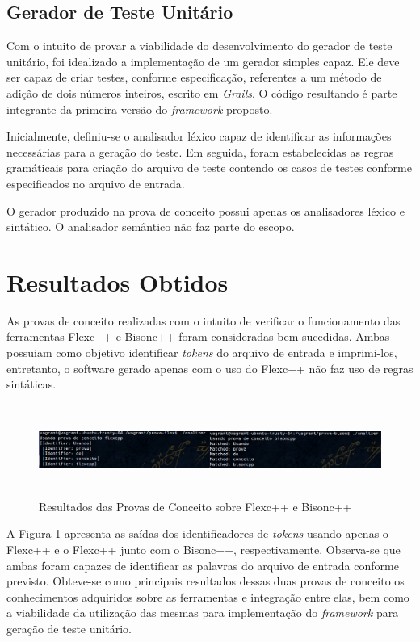 \subsection{Gerador de Teste Unitário}
Com o intuito de provar a viabilidade do desenvolvimento do gerador de teste unitário, foi idealizado a implementação de um gerador simples capaz. Ele deve ser capaz de criar testes, conforme especificação, referentes a um método de adição de dois números inteiros, escrito em \textit{Grails}. O código resultando é parte integrante da primeira versão do \textit{framework} proposto. 
\par 
\indent Inicialmente, definiu-se o analisador léxico capaz de identificar as informações necessárias para a geração do teste. Em seguida, foram estabelecidas as regras gramáticais para criação do arquivo de teste contendo os casos de testes conforme especificados no arquivo de entrada.
\par 
\indent O gerador produzido na prova de conceito possui apenas os analisadores léxico e sintático. O analisador semântico não faz parte do escopo.

\section{Resultados Obtidos}
As provas de conceito realizadas com o intuito de verificar o funcionamento das ferramentas Flexc++ e Bisonc++ foram consideradas bem sucedidas. Ambas possuiam como objetivo identificar \textit{tokens} do arquivo de entrada e imprimi-los, entretanto, o software gerado apenas com o uso do Flexc++ não faz uso de regras sintáticas. 

 \begin{figure}[h]
    \centering
    \includegraphics[width=\textwidth,height=3cm]{figuras/resultadosPCBF.png}
    \caption{Resultados das Provas de Conceito sobre Flexc++ e Bisonc++}
    \label{fig:resultadosPCBF}
 \end{figure}

\par
\indent A Figura \ref{fig:resultadosPCBF} apresenta as saídas dos identificadores de \textit{tokens} usando apenas o Flexc++ e o Flexc++ junto com o Bisonc++, respectivamente. Observa-se que ambas foram capazes de identificar as palavras do arquivo de entrada conforme previsto. Obteve-se como principais resultados dessas duas provas de conceito os conhecimentos adquiridos sobre as ferramentas e integração entre elas, bem como a viabilidade da utilização das mesmas para implementação do \textit{framework} para geração de teste unitário.

